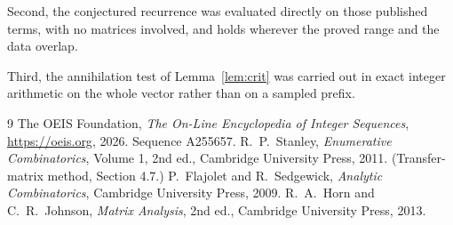 \documentclass[11pt,a4paper]{article}
\theoremstyle{plain}
\theoremstyle{definition}
\begin{document}
Second, the conjectured recurrence was evaluated directly on those published terms, with no
matrices involved, and holds wherever the proved range and the data overlap.

Third, the annihilation test of Lemma~\ref{lem:crit} was carried out in exact integer
arithmetic on the whole vector rather than on a sampled prefix.

\begin{thebibliography}{9}
 The OEIS Foundation, \emph{The On-Line Encyclopedia of Integer
Sequences}, \url{https://oeis.org}, 2026. Sequence A255657.
 R.~P.~Stanley, \emph{Enumerative Combinatorics}, Volume 1, 2nd ed.,
Cambridge University Press, 2011. (Transfer-matrix method, Section 4.7.)
 P.~Flajolet and R.~Sedgewick, \emph{Analytic Combinatorics}, Cambridge
University Press, 2009.
 R.~A.~Horn and C.~R.~Johnson, \emph{Matrix Analysis}, 2nd ed., Cambridge
University Press, 2013.
\end{thebibliography}
\end{document}
